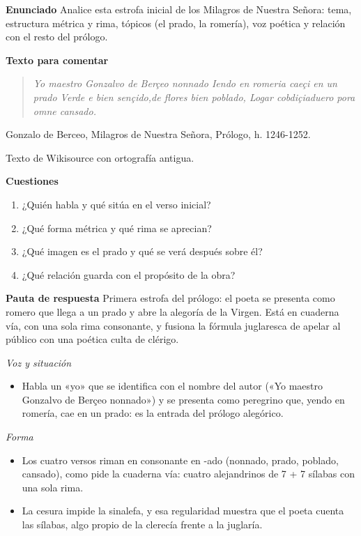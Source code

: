 \documentclass{book}
\begin{document}
\begin{tcolorbox}[title={Ejercicio resuelto}, studiumworked, breakable]

\noindent\textbf{Enunciado}
Analice esta estrofa inicial de los Milagros de Nuestra Señora: tema, estructura métrica y rima, tópicos (el prado, la romería), voz poética y relación con el resto del prólogo.


\noindent\textbf{Texto para comentar}

\begin{quote}
\itshape Yo maestro Gonzalvo de Berçeo nonnado Iendo en romeria caeçi en un prado Verde e bien sençido,de flores bien poblado, Logar cobdiçiaduero pora omne cansado.
\end{quote}
{\noindent\footnotesize Gonzalo de Berceo, Milagros de Nuestra Señora, Prólogo, h. 1246-1252.\par}
{\noindent\footnotesize Texto de Wikisource con ortografía antigua.\par}

\noindent\textbf{Cuestiones}
\begin{enumerate}
\item ¿Quién habla y qué sitúa en el verso inicial?
\item ¿Qué forma métrica y qué rima se aprecian?
\item ¿Qué imagen es el prado y qué se verá después sobre él?
\item ¿Qué relación guarda con el propósito de la obra?
\end{enumerate}

\noindent\textbf{Pauta de respuesta}
Primera estrofa del prólogo: el poeta se presenta como romero que llega a un prado y abre la alegoría de la Virgen. Está en cuaderna vía, con una sola rima consonante, y fusiona la fórmula juglaresca de apelar al público con una poética culta de clérigo.


\noindent\textit{Voz y situación}
\begin{itemize}
\item Habla un «yo» que se identifica con el nombre del autor («Yo maestro Gonzalvo de Berçeo nonnado») y se presenta como peregrino que, yendo en romería, cae en un prado: es la entrada del prólogo alegórico.
\end{itemize}

\noindent\textit{Forma}
\begin{itemize}
\item Los cuatro versos riman en consonante en -ado (nonnado, prado, poblado, cansado), como pide la cuaderna vía: cuatro alejandrinos de 7 + 7 sílabas con una sola rima.
\item La cesura impide la sinalefa, y esa regularidad muestra que el poeta cuenta las sílabas, algo propio de la clerecía frente a la juglaría.
\end{itemize}


\end{tcolorbox}
\end{document}
